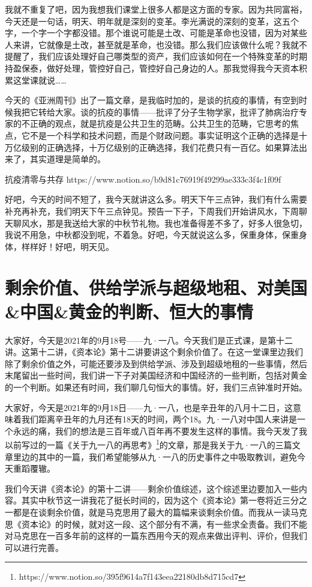 \documentclass[UTF8, 12pt, a4paper]{ctexrep}
\begin{document}
我就不重复了吧，因为我想我们课堂上很多人都是这方面的专家。因为共同富裕，今天还是一句话，明天、明年就是深刻的变革。李光满说的深刻的变革，这五个字，一个字一个字都没错。那个谁说可能是土改、可能是革命也没错，因为对某些人来讲，它就像是土改，甚至就是革命，也没错。那么我们应该做什么呢？我就不提醒了，我们应该处理好自己哪类型的资产，我们应该如何在一个特殊变革的时期持盈保泰，做好处理，管控好自己，管控好自己身边的人。那我觉得我今天资本积累这堂课就说……

今天的《亚洲周刊》出了一篇文章，是我临时加的，是谈的抗疫的事情，有空到时候我把它转给大家。谈的抗疫的事情——批评了分子生物学家，批评了肺病治疗专家的不正确的观点，就是抗疫是公共卫生的范畴。公共卫生的范畴，它思考的焦点，它不是一个科学和技术问题，而是个财政问题。事实证明这个正确的选择是十万亿级别的正确选择，十万亿级别的正确选择，我们花费只有一百亿。如果算法出来了，其实道理是简单的。

抗疫清零与共存 https://www.notion.so/b9d81c76919f49299ae333c3f4c1f09f

好吧，今天的时间不短了，我今天就讲这么多。明天下午三点钟，我们有什么需要补充再补充，我们明天下午三点钟见。预告一下子，下周我们开始讲风水，下周聊天聊风水，那是我送给大家的中秋节礼物。我也准备得差不多了，好多人很急切，我说不用急，中秋都没到呢，不着急。好吧，今天就说这么多，保重身体，保重身体，样样好！好吧，明天见。

\section{剩余价值、供给学派与超级地租、对美国\&中国\&黄金的判断、恒大的事情}

大家好，今天是2021年的9月18号——九·一八。今天我们是正式课，是第十二讲。这第十二讲，《资本论》第十二讲要讲这个剩余价值了。在这一堂课里边我们除了剩余价值之外，可能还要涉及到供给学派、涉及到超级地租的一些事情，然后末尾留出一些时间，我们讲一下子对美国经济和中国经济的一些判断，包括对黄金的一个判断。如果还有时间，我们聊几句恒大的事情。好，我们三点钟准时开始。

大家好，今天是2021年的9月18日——九·一八，也是辛丑年的八月十二日，这意味着我们距离辛丑年的九月还有18天的时间，两个18。九·一八对中国人来讲是一个永远的痛，我们的想法是三百年或八百年再不要发生这样的事情。我今天发了我以前写过的一篇《关于九一八的再思考》\footnote{https://www.notion.so/395f9614a7f143eea22180db8d715cd7}的文章，那是我关于九·一八的三篇文章里边的其中的一篇，我们希望能够从九·一八的历史事件之中吸取教训，避免今天重蹈覆辙。

我们今天讲《资本论》的第十二讲——剩余价值综述，这个综述里边要加入一些内容。其实中秋节这一讲我花了挺长时间的，因为这个《资本论》第一卷将近三分之一都是在谈剩余价值，就是马克思用了最大的篇幅来谈剩余价值。而我从一读马克思《资本论》的时候，就对这一段、这个部分有不满，有一些求全责备。我们不能对马克思在一百多年前的这样的一篇东西用今天的观点来做出评判、评价，但我们可以进行完善。
\end{document}
